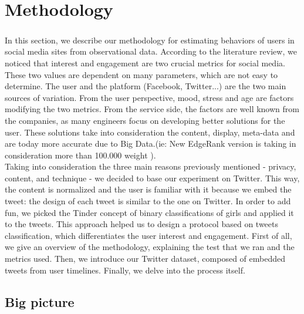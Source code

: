 \chapter{Methodology}
\setcounter{secnumdepth}{3}

\paragraph{}
In this section, we describe our methodology for estimating behaviors of users in social media sites from observational data. According to the literature review, we noticed that interest and engagement are two crucial metrics for social media. These two values are dependent on many parameters, which are not easy to determine. The user and the platform (Facebook, Twitter...) are the two main sources of variation. From the user perspective, mood, stress and age \cite{f_youth_engagement} are factors modifying the two metrics. From the service side, the factors are well known from the companies, as many engineers focus on developing better solutions for the user. These solutions take into consideration the content, display, meta-data and are today more accurate due to Big Data.(ie: New EdgeRank version is taking in consideration more than 100.000 weight \cite{f_EdgeRank2}).\\
Taking into consideration the three main reasons previously mentioned - privacy, content, and technique - we decided to base our experiment on Twitter. This way, the content is normalized and the user is familiar with it because we embed the tweet: the design of each tweet is similar to the one on Twitter. In order to add fun, we picked the Tinder concept of binary classifications of girls and applied it to the tweets. This approach helped us to design a protocol based on tweets classification, which differentiates the user interest and engagement.
First of all, we give an overview of the methodology, explaining the test that we ran and the metrics used. Then, we introduce our Twitter dataset, composed of embedded tweets from user timelines. Finally, we delve into the process itself.

\section{Big picture}


